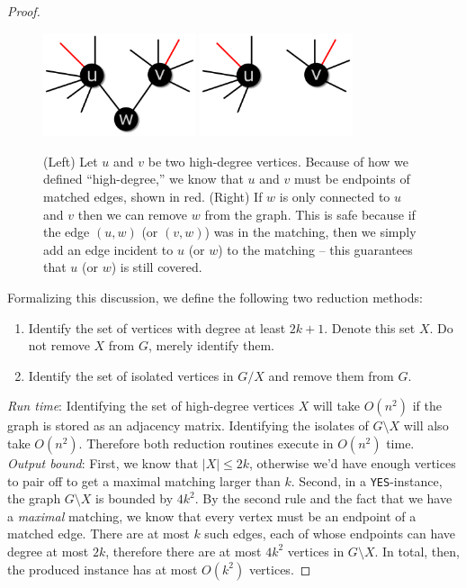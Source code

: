 \documentclass{article}
\begin{document}
\begin{proof}
\begin{figure}
\label{figure:problem1}
\begin{center}
\includegraphics[width=0.4\textwidth]{frame1}
\hspace{0.15\textwidth}
\includegraphics[width=0.4\textwidth]{frame2}
\end{center}
\caption{(Left) Let $u$ and $v$ be two high-degree vertices. Because of how we defined ``high-degree,'' we know that $u$ and $v$ must be endpoints of matched edges, shown in red. (Right) If $w$ is only connected to $u$ and $v$ then we can remove $w$ from the graph. This is safe because if the edge $(u, w)$ (or $(v, w)$) was in the matching, then we simply add an edge incident to $u$ (or $w$) to the matching -- this guarantees that $u$ (or $w$) is still covered.}
\end{figure}

\newpage
Formalizing this discussion, we define the following two reduction methods:
\begin{enumerate}[\text{RR}1.]
\item Identify the set of vertices with degree at least $2k+1$. Denote this set $X$. Do not remove $X$ from $G$, merely identify them.
\item Identify the set of isolated vertices in $G / X$ and remove them from $G$.
\end{enumerate}

\noindent \emph{Run time}: Identifying the set of high-degree vertices $X$ will take $O(n^2)$ if the graph is stored as an adjacency matrix. Identifying the isolates of $G \setminus X$ will also take $O(n^2)$. Therefore both reduction routines execute in $O(n^2)$ time.\\

\noindent \emph{Output bound}: First, we know that $|X| \leq 2k$, otherwise we'd have enough vertices to pair off to get a maximal matching larger than $k$. Second, in a \texttt{YES}-instance, the graph $G \setminus X$ is bounded by $4k^2$. By the second rule and the fact that we have a \emph{maximal} matching, we know that every vertex must be an endpoint of a matched edge. There are at most $k$ such edges, each of whose endpoints can have degree at most $2k$, therefore there are at most $4k^2$ vertices in $G \setminus X$. In total, then, the produced instance has at most $O(k^2)$ vertices.
\end{proof}
\end{document}
